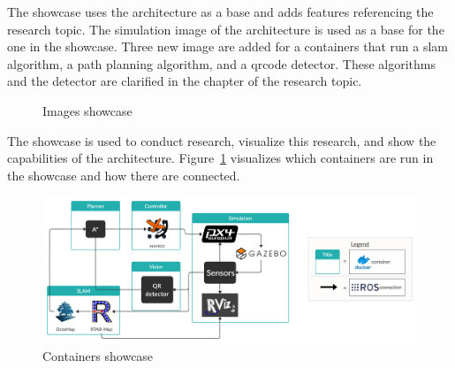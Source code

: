 The showcase uses the architecture as a base and adds features referencing the research topic. The simulation image of the architecture is used as a base for the one in the showcase. Three new image are added for a containers that run a \acs{slam} algorithm, a path planning algorithm, and a \acs{qrcode} detector. These algorithms and the detector are clarified in the chapter of the research topic.

\begin{figure}[!h]
  \centering
  \caption{Images showcase}
\end{figure}

The showcase is used to conduct research, visualize this research, and show the capabilities of the architecture. Figure~\ref{fig:showcase_containers} visualizes which containers are run in the showcase and how there are connected.

\begin{figure}[!h]
  \centering
  \includegraphics[width=\linewidth]{images/showcase_containers.png}
  \caption{Containers showcase}
  \label{fig:showcase_containers}
\end{figure}